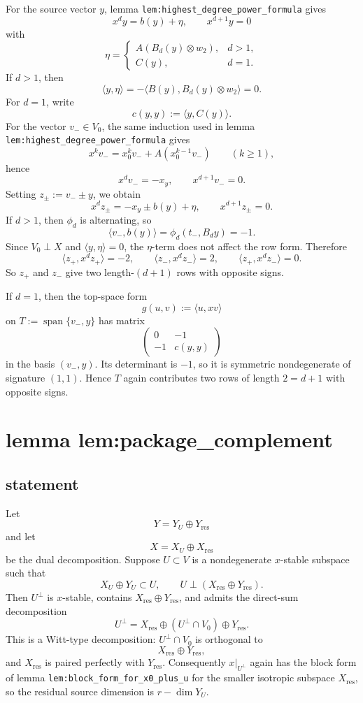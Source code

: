 \documentclass[
]{article}
\begin{document}
For the source vector \(y\), lemma
\texttt{lem:highest\_degree\_power\_formula} gives \[
x^dy=b(y)+\eta,\qquad x^{d+1}y=0
\] with \[
\eta=
\begin{cases}
A(B_d(y)\otimes w_2), & d>1,\\
C(y), & d=1.
\end{cases}
\] If \(d>1\), then \[
\langle y,\eta\rangle=-\langle B(y),B_d(y)\otimes w_2\rangle=0.
\] For \(d=1\), write \[
c(y,y):=\langle y,C(y)\rangle.
\] For the vector \(v_-\in V_0\), the same induction used in lemma
\texttt{lem:highest\_degree\_power\_formula} gives \[
x^kv_-=x_0^kv_-+A(x_0^{k-1}v_-)\qquad (k\ge 1),
\] hence \[
x^dv_-=-x_y,\qquad x^{d+1}v_-=0.
\] Setting \(z_\pm:=v_-\pm y\), we obtain \[
x^dz_\pm=-x_y\pm b(y)+\eta,\qquad x^{d+1}z_\pm=0.
\] If \(d>1\), then \(\phi_d\) is alternating, so \[
\langle v_-,b(y)\rangle=\phi_d(t_-,B_dy)=-1.
\] Since \(V_0\perp X\) and \(\langle y,\eta\rangle=0\), the
\(\eta\)-term does not affect the row form. Therefore \[
\langle z_+,x^dz_+\rangle=-2,\qquad
\langle z_-,x^dz_-\rangle=2,\qquad
\langle z_+,x^dz_-\rangle=0.
\] So \(z_+\) and \(z_-\) give two length-\((d+1)\) rows with opposite
signs.

If \(d=1\), then the top-space form \[
g(u,v):=\langle u,xv\rangle
\] on \(T:=\operatorname{span}\{v_-,y\}\) has matrix \[
\begin{pmatrix}
0 & -1\\
-1 & c(y,y)
\end{pmatrix}
\] in the basis \((v_-,y)\). Its determinant is \(-1\), so it is
symmetric nondegenerate of signature \((1,1)\). Hence \(T\) again
contributes two rows of length \(2=d+1\) with opposite signs.

\section{lemma
lem:package\_complement}\label{lemma-lempackage_complement}

\subsection{statement}\label{statement-15}

Let \[
Y=Y_U\oplus Y_{\mathrm{res}}
\] and let \[
X=X_U\oplus X_{\mathrm{res}}
\] be the dual decomposition. Suppose \(U\subset V\) is a nondegenerate
\(x\)-stable subspace such that \[
X_U\oplus Y_U\subset U,
\qquad
U\perp (X_{\mathrm{res}}\oplus Y_{\mathrm{res}}).
\] Then \(U^\perp\) is \(x\)-stable, contains
\(X_{\mathrm{res}}\oplus Y_{\mathrm{res}}\), and admits the direct-sum
decomposition \[
U^\perp=X_{\mathrm{res}}\oplus (U^\perp\cap V_0)\oplus Y_{\mathrm{res}}.
\] This is a Witt-type decomposition: \(U^\perp\cap V_0\) is orthogonal
to \[
X_{\mathrm{res}}\oplus Y_{\mathrm{res}},
\] and \(X_{\mathrm{res}}\) is paired perfectly with
\(Y_{\mathrm{res}}\). Consequently \(x|_{U^\perp}\) again has the block
form of lemma \texttt{lem:block\_form\_for\_x0\_plus\_u} for the smaller
isotropic subspace \(X_{\mathrm{res}}\), so the residual source
dimension is \(r-\dim Y_U\).
\end{document}
